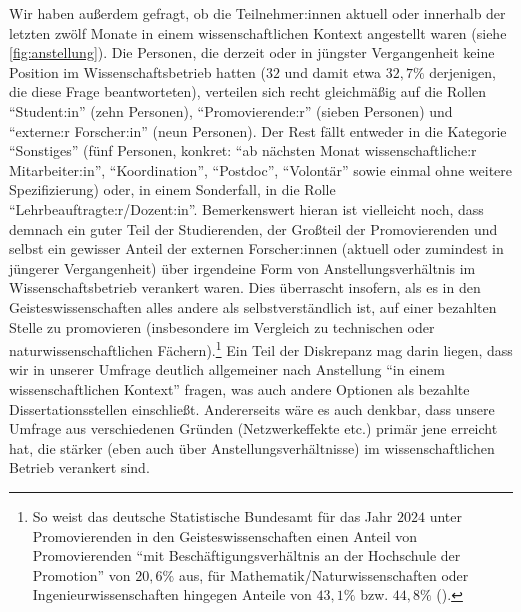 \documentclass{scrartcl}
\begin{document}
Wir haben außerdem gefragt, ob die Teilnehmer:innen aktuell oder innerhalb der letzten zwölf Monate in einem wissenschaftlichen Kontext angestellt waren (siehe \autoref{fig:anstellung}).
Die Personen, die derzeit oder in jüngster Vergangenheit keine Position im Wissenschaftsbetrieb hatten ($32$ und damit etwa $32,7\%$ derjenigen, die diese Frage beantworteten), verteilen sich recht gleichmäßig auf die Rollen \enquote{Student:in} (zehn Personen), \enquote{Promovierende:r} (sieben Personen) und \enquote{externe:r Forscher:in} (neun Personen).
Der Rest fällt entweder in die Kategorie \enquote{Sonstiges} (fünf Personen, konkret: \enquote{ab nächsten Monat wissenschaftliche:r Mitarbeiter:in}, \enquote{Koordination}, \enquote{Postdoc}, \enquote{Volontär} sowie einmal ohne weitere Spezifizierung) oder, in einem Sonderfall, in die Rolle \enquote{Lehrbeauftragte:r/Dozent:in}.
Bemerkenswert hieran ist vielleicht noch, dass demnach ein guter Teil der Studierenden, der Großteil der Promovierenden und selbst ein gewisser Anteil der externen Forscher:innen (aktuell oder zumindest in jüngerer Vergangenheit) über irgendeine Form von Anstellungsverhältnis im Wissenschaftsbetrieb verankert waren.
Dies überrascht insofern, als es in den Geisteswissenschaften alles andere als selbstverständlich ist, auf einer bezahlten Stelle zu promovieren (insbesondere im Vergleich zu technischen oder naturwissenschaftlichen Fächern).\footnote{So weist das deutsche Statistische Bundesamt für das Jahr $2024$ unter Promovierenden in den Geisteswissenschaften einen Anteil von Promovierenden \enquote{mit Beschäftigungsverhältnis an der Hochschule der Promotion} von $20,6\%$ aus, für Mathematik/Naturwissenschaften oder Ingenieurwissenschaften hingegen Anteile von $43,1\%$ bzw. $44,8\%$ (\autocite[vgl.][]{statistisches_bundesamt_tabelle_2025}).}
Ein Teil der Diskrepanz mag darin liegen, dass wir in unserer Umfrage deutlich allgemeiner nach Anstellung \enquote{in einem wissenschaftlichen Kontext} fragen, was auch andere Optionen als bezahlte Dissertationsstellen einschließt.
Andererseits wäre es auch denkbar, dass unsere Umfrage aus verschiedenen Gründen (Netzwerkeffekte etc.) primär jene erreicht hat, die stärker (eben auch über Anstellungsverhältnisse) im wissenschaftlichen Betrieb verankert sind.
\end{document}
